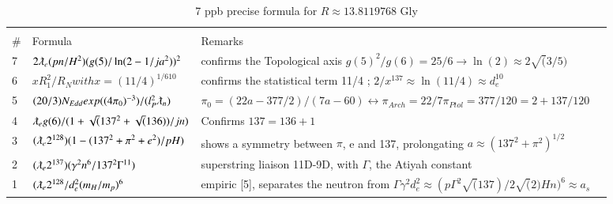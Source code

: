 \documentclass[a4paper,9pt]{article}
\begin{document}
\begin{appendix}
\begin{table}
\begin{tabular}{llll}
  
    \bottomrule
  \end{tabular}
\end{table}

\begin{table}
\caption{7 ppb precise formula for $R \approx 13.8119768$ Gly}
\label{tab:6:table6}
  \hskip-2.0cm\begin{tabular}{llll}
    \toprule
    \multicolumn{3}{c}{}                   \\
    \cmidrule(r){1-3}
    \#     & Formula  & Remarks \\
    \midrule
    
    
   
    7 & $2\lambdabar_{e} (pn/H^{2})(g(5)/\ln(2-1/ja^2))^2$   & confirms the Topological axis $g(5)^2/g(6) = 25/6 \rightarrow \ln(2) \approx 2\sqrt(3/5)$  \\
    
    6 & $xR_1^2/R_N with x = (11/4)^{1/610}$ &  confirms the statistical term 11/4 ; $2/x^{137} \approx \ln(11/4) \approx d_e^{10}$ \\
    
    5 & $(20/3)N_{Edd} exp((4 \pi_0)^{-3})/(l_P^2\lambdabar_n)$ & $\pi_0 =  (22a - 377/2)/(7a - 60) \leftrightarrow \pi_{Arch} = 22/7  \pi_{Ptol} = 377/120 = 2 + 137/120$  \\
    
     4 & $\lambdabar_{e} g(6)/(1+\sqrt(137^2+\sqrt(136))/jn)$  & Confirms $137=136+1$ \\
    3 & $(\lambdabar_{e} 2^{128})(1-(137^2+\pi^2+e^2)/pH)$ & shows a symmetry between $\pi$, e and 137, prolongating $ a \approx (137^2 + \pi^2)^{1/2}$ \\
     2 & $(\lambdabar_{e} 2^{137})(\gamma^2 n^6 / 137^2 \Gamma^{11})$ & superstring liaison 11D-9D, with $\Gamma$, the Atiyah constant \\
    1 & $(\lambdabar_{e} 2^{128}/d_e^2(m_H/m_p)^6$  & empiric [5], separates the neutron from $\Gamma \gamma^2 d_e^2 \approx (p\Gamma^2 \sqrt(137)/2 \sqrt(2) Hn)^6 \approx a_s$ \\
    
    \bottomrule
  \end{tabular}
\end{table}


% 


\end{appendix}
\end{document}
